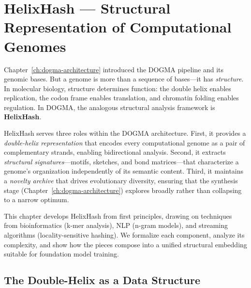 
\chapter{HelixHash --- Structural Representation of Computational Genomes}
\label{ch:helixhash}


\noindent
Chapter~\ref{ch:dogma-architecture} introduced the DOGMA pipeline and its genomic bases. But a genome is more than a sequence of bases---it has \emph{structure}. In molecular biology, structure determines function: the double helix enables replication, the codon frame enables translation, and chromatin folding enables regulation. In DOGMA, the analogous structural analysis framework is \textbf{HelixHash}.

HelixHash serves three roles within the DOGMA architecture. First, it provides a \emph{double-helix representation} that encodes every computational genome as a pair of complementary strands, enabling bidirectional analysis. Second, it extracts \emph{structural signatures}---motifs, sketches, and bond matrices---that characterize a genome's organization independently of its semantic content. Third, it maintains a \emph{novelty archive} that drives evolutionary diversity, ensuring that the synthesis stage (Chapter~\ref{ch:dogma-architecture}) explores broadly rather than collapsing to a narrow optimum.

This chapter develops HelixHash from first principles, drawing on techniques from bioinformatics (k-mer analysis), NLP (n-gram models), and streaming algorithms (locality-sensitive hashing). We formalize each component, analyze its complexity, and show how the pieces compose into a unified structural embedding suitable for foundation model training.

\section{The Double-Helix as a Data Structure}
\label{sec:double-helix}

